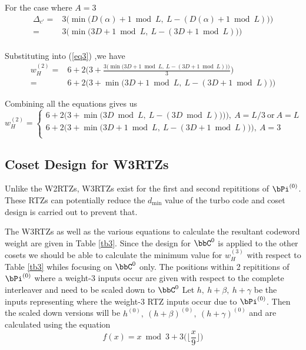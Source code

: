 For the case where $A=3$
 \begin{equation}
 \begin{split}
\Delta_{c'}=&3\Bigg(\min{\Big(D(\alpha)+1 \bmod L,~ L-(D(\alpha)+1 \bmod L)\Big)\Bigg)}\\
=&3\Bigg(\min{\Big(3D +1 \bmod L,~ L-(3D+1 \bmod L)\Big)\Bigg)}\\
\end{split}
 \end{equation}
 
Substituting into (\ref{eq3}) ,we have
\begin{equation*}
\begin{split}
w^{(2)}_H=&6+2\Big(3+\frac{3\Bigg(\min{\Big(3D+1 \bmod L,~ L-(3D+1 \bmod L)\Big)\Bigg)}}{3}\Big)\\
=&6+2\Big(3+\min{\Big(3D+1 \bmod L,~ L-(3D+1 \bmod L)\Big)}\Big)
\end{split}
\end{equation*}

Combining all the equations gives us 
\begin{equation}
w^{(2)}_H=
\begin{cases}
6+2\Big(3+\min{\Big(3D \bmod L,~ L-(3D \bmod L)\Big)\Bigg)}\Big),~A=L/3 ~\text{or}~A=L\\
6+2\Big(3+\min{\Big(3D+1 \bmod L,~ L-(3D+1 \bmod L)\Big)}\Big), ~A=3\\
\end{cases}
\label{eq9}
\end{equation}

 \subsection{Coset Design for W3RTZs}
 Unlike the W2RTZs, W3RTZs exist for the first and second repititions of $\bPi^{(0)}$. These RTZs can potentially reduce the $d_{\text{min}}$ value of the turbo code and coset design is carried out to prevent that.
 
 The W3RTZs as well as the various equations to calculate the resultant codeword weight are given in Table \ref{tb3}. 
 Since the design for $\bbC^0$ is applied to the other cosets we should be able to calculate the minimum value for $w_H^{(3)}$ with respect to Table \ref{tb3} whiles focusing on $\bbC^0$ only.
 The positions within 2 repititions of $\bPi^{(0)}$ where a weight-$3$ inputs occur are given with respect to the complete interleaver and need to be scaled down to $\bbC^0$
 Let $h,~h+\beta,~h+\gamma$ be the inputs representing where the weight-$3$ RTZ inputs occur due to $\bPi^{(0)}$. Then the scaled down versions will be $h^{(0)},~(h+\beta)^{(0)},~(h+\gamma)^{(0)}$ and are calculated using the equation
 \begin{equation}
 f(x)= x \bmod 3 + 3\Big(\Big\lfloor\frac{x}{9} \Big\rfloor\Big)
 \label{eq9}
 \end{equation}
 
